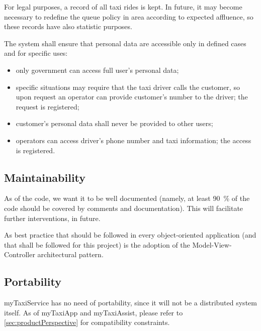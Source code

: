 For legal purposes, a record of all taxi rides is kept. In future, it may become necessary to redefine the queue policy in area according to expected affluence, so these records have also statistic purposes.

The system shall ensure that personal data are accessible only in defined cases and for specific uses: 
\begin{itemize}
	
	\item only government can access full user's personal data;
	
	\item specific situations may require that the taxi driver calls the customer, so upon request an operator can provide customer's number to the driver; the request is registered;
	
	\item customer's personal data shall never be provided to other users;
	
	\item operators can access driver's phone number and taxi information; the access is registered.

\end{itemize}


\subsection{Maintainability}
As of the code, we want it to be well documented (namely, at least \SI{90}{\percent} of the code should be covered by comments and documentation). This will facilitate further interventions, in future. 

As best practice that should be followed in every object-oriented application (and that shall be followed for this project) is the adoption of the Model-View-Controller architectural pattern. 


\subsection{Portability}
myTaxiService has no need of portability, since it will not be a distributed system itself. As of myTaxiApp and myTaxiAssist, please refer to \cref{sec:productPerspective} for compatibility constraints.


